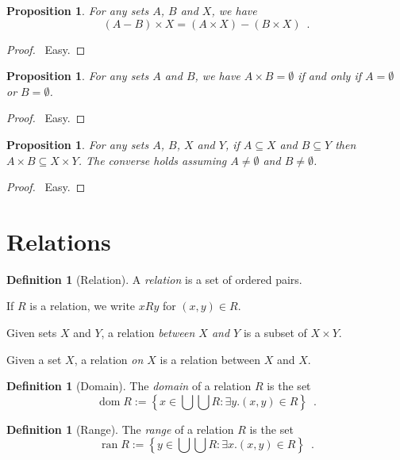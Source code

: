 \documentclass{report}
\let\qed\relax
\newtheorem{prop}[ax]{Proposition}
\theoremstyle{definition}
\newtheorem{df}[ax]{Definition}
\newcommand{\dom}{\ensuremath{\operatorname{dom}}}
\newcommand{\ran}{\ensuremath{\operatorname{ran}}}
\begin{document}
\begin{prop}
For any sets $A$, $B$ and $X$, we have
\[ (A - B) \times X = (A \times X) - (B \times X) \enspace . \]
\end{prop}

\begin{proof}
\pf\ Easy. \qed
\end{proof}

\begin{prop}
For any sets $A$ and $B$, we have $A \times B = \emptyset$ if and only if $A = \emptyset$ or $B = \emptyset$.
\end{prop}

\begin{proof}
\pf\ Easy. \qed
\end{proof}

\begin{prop}
For any sets $A$, $B$, $X$ and $Y$, if $A \subseteq X$ and $B \subseteq Y$ then $A \times B \subseteq X \times Y$. The converse holds assuming $A \neq \emptyset$ and $B \neq \emptyset$.
\end{prop}

\begin{proof}
\pf\ Easy. \qed
\end{proof}

\section{Relations}

\begin{df}[Relation]
A \emph{relation} is a set of ordered pairs.

If $R$ is a relation, we write $xRy$ for $(x,y) \in R$.

Given sets $X$ and $Y$, a relation \emph{between $X$ and $Y$} is a subset of $X \times Y$.

Given a set $X$, a relation \emph{on $X$} is a relation between $X$ and $X$.
\end{df}

\begin{df}[Domain]
The \emph{domain} of a relation $R$ is the set
\[ \dom R := \left\{ x \in \bigcup \bigcup R : \exists y. (x,y) \in R \right\} \enspace . \]
\end{df}

\begin{df}[Range]
The \emph{range} of a relation $R$ is the set
\[ \ran R := \left\{ y \in \bigcup \bigcup R : \exists x. (x,y) \in R \right\} \enspace . \]
\end{df}
\end{document}
